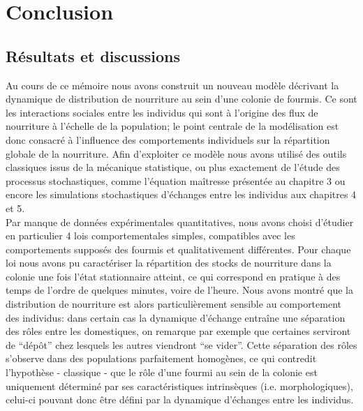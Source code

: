 \chapter{Conclusion}

\section{Résultats et discussions}


Au cours de ce mémoire nous avons construit un nouveau modèle décrivant la dynamique de distribution de nourriture au sein d'une colonie de fourmis. Ce sont les interactions sociales entre les individus qui sont à l'origine des flux de nourriture à l'échelle de la population; le point centrale de la modélisation est donc consacré à l'influence des comportements individuels sur la répartition globale de la nourriture. Afin d'exploiter ce modèle nous avons utilisé des outils classiques issus de la mécanique statistique, ou plus exactement de l'étude des processus stochastiques, comme l'équation maîtresse présentée au chapitre 3 ou encore les simulations stochastiques d'échanges entre les individus aux chapitres 4 et 5. \\

Par manque de données expérimentales quantitatives, nous avons choisi d'étudier en particulier 4 lois comportementales simples, compatibles avec les comportements supposés des fourmis et qualitativement différentes. Pour chaque loi nous avons pu caractériser la répartition des stocks de nourriture dans la colonie une fois l'état stationnaire atteint, ce qui correspond en pratique à des temps de l'ordre de quelques minutes, voire de l'heure. Nous avons montré que la distribution de nourriture est alors particulièrement sensible au comportement des individus: dans certain cas la dynamique d'échange entraîne une séparation des rôles entre les domestiques, on remarque par exemple que certaines serviront de ``dépôt'' chez lesquels les autres viendront ``se vider''. Cette séparation des rôles s'observe dans des populations parfaitement homogènes, ce qui contredit l'hypothèse - classique - que le rôle d'une fourmi au sein de la colonie est uniquement déterminé par ses caractéristiques intrinsèques (i.e. morphologiques), celui-ci pouvant donc être défini par la dynamique d'échanges entre les individus.\\ 

